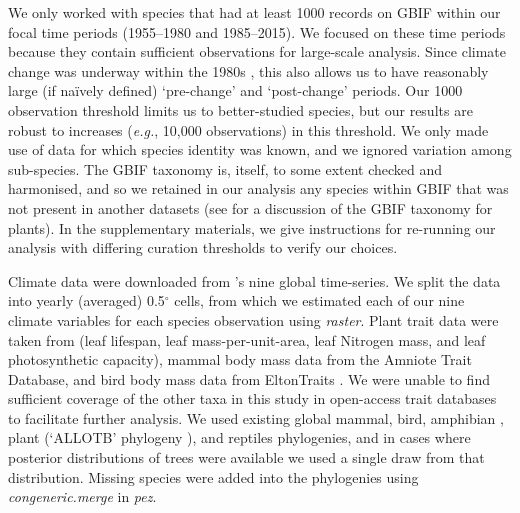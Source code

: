 \documentclass[12pt]{report}
\begin{document}
We only worked with species that had at least 1000 records on GBIF
within our focal time periods (1955--1980 and 1985--2015). We focused
on these time periods because they contain sufficient observations for
large-scale analysis. Since climate change was underway within the
1980s \supercite{IPCC2014}, this also allows us to have reasonably
large (if na\"{i}vely defined) `pre-change' and `post-change'
periods. Our 1000 observation threshold limits us to better-studied
species, but our results are robust to increases (\emph{e.g.}, 10,000
observations) in this threshold. We only made use of data for which
species identity was known, and we ignored variation among
sub-species. The GBIF taxonomy is, itself, to some extent checked and
harmonised, and so we retained in our analysis any species within GBIF
that was not present in another datasets (see
\citeauthor{Cornwell2019}\supercite{Cornwell2019} for a discussion of
the GBIF taxonomy for plants). In the supplementary materials, we give
instructions for re-running our analysis with differing curation
thresholds to verify our choices.

Climate data were downloaded from
\citeauthor{Harris2014}\supercite{Harris2014}'s nine global
time-series. We split the data into yearly (averaged) 0.5$^\circ$
cells, from which we estimated each of our nine climate variables for
each species observation using
\emph{raster}\supercite{Hijmans2019}. Plant trait data were taken from
\citeauthor{Wright2004}\supercite{Wright2004} (leaf lifespan, leaf
mass-per-unit-area, leaf Nitrogen mass, and leaf photosynthetic
capacity), mammal body mass data from the Amniote Trait
Database\supercite{Myhrvold2015}, and bird body mass data from
EltonTraits \supercite{Wilman2014}. We were unable to find sufficient
coverage of the other taxa in this study in open-access trait
databases to facilitate further analysis. We used existing global
mammal\supercite{Faurby2015}, bird\supercite{Jetz2012}, amphibian
\supercite{Jetz2018}, plant (`ALLOTB' phylogeny
\supercite{Smith2018}), and reptiles\supercite{Zheng2016} phylogenies,
and in cases where posterior distributions of trees were available we
used a single draw from that distribution. Missing species were added
into the phylogenies using \emph{congeneric.merge} in
\emph{pez}\supercite{Pearse2015}.
\end{document}

